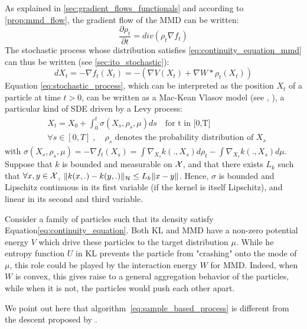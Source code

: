 As explained in \cref{sec:gradient_flows_functionals} and according to \cref{prop:mmd_flow}, the gradient flow of the MMD can be written:
\begin{equation}\label{eq:continuity_equation_mmd}
\frac{\partial \rho_t}{\partial t}= div(\rho_t  \nabla f_t)
\end{equation}
The stochastic process whose distribution satisfies \eqref{eq:continuity_equation_mmd} can thus be written (see \cref{sec:ito_stochastic}):
\begin{equation}\label{eq:stochastic_process}
dX_t=-\nabla f_t(X_t) = - (\nabla V (X_t) + \nabla W * \rho_t(X_t))
\end{equation}
Equation \eqref{eq:stochastic_process}, which can be interpreted as the position $X_t$ of a particle at time $t > 0$, can be written as a Mac-Kean Vlasov model (see \cite{kac1956foundations}, \cite{mckean1966class}), a particular kind of SDE driven by a Levy process:
\begin{align}\label{eq:theoretical_process}
&X_t=X_{0}+\int_{0}^t \sigma(X_s, \rho_s, \mu)ds \quad \text{for t in [0,T]}\\
&\forall s \in [0,T]\;,\quad \rho_s \text{ denotes the probability distribution of } X_s
\end{align}
with $\sigma(X_s, \rho_s, \mu)=-\nabla f_t(X_s)=\int \nabla_{X_s}k(.,X_s) d\rho_t -  \int \nabla_{X_s}k(.,X_s) d\mu$. Suppose that $k$ is bounded and measurable on ${{\mathcal X}}$, and that there exists $L_k$ such that $\forall x,y \in {{\mathcal X}}$, $\| k(x,.)-k(y,.) \|_{{{\mathcal H}}}\le L_k \|x-y\|$. Hence, $\sigma$ is bounded and Lipschitz continuous in its first variable (if the kernel is itself Lipschitz), and linear in its second and third variable. 


\begin{remark}
	Consider a family of particles such that its density satisfy Equation\eqref{eq:continuity_equation}. Both KL and MMD have a non-zero potential energy $V$ which drive these particles to the target distribution $\mu$. While he entropy function $U$ in KL prevents the particle from "crashing" onto the mode of $\mu$, this role could be played by the interaction energy $W$ for MMD. Indeed, when $W$ is convex, this gives raise to a general
	aggregation behavior of the particles, while when it is not, the particles would push each other apart.
\end{remark}

\begin{remark}
	We point out here that algorithm~\eqref{eq:sample_based_process} is different from the descent proposed by \cite{mroueh2018regularized}. 
\end{remark}








